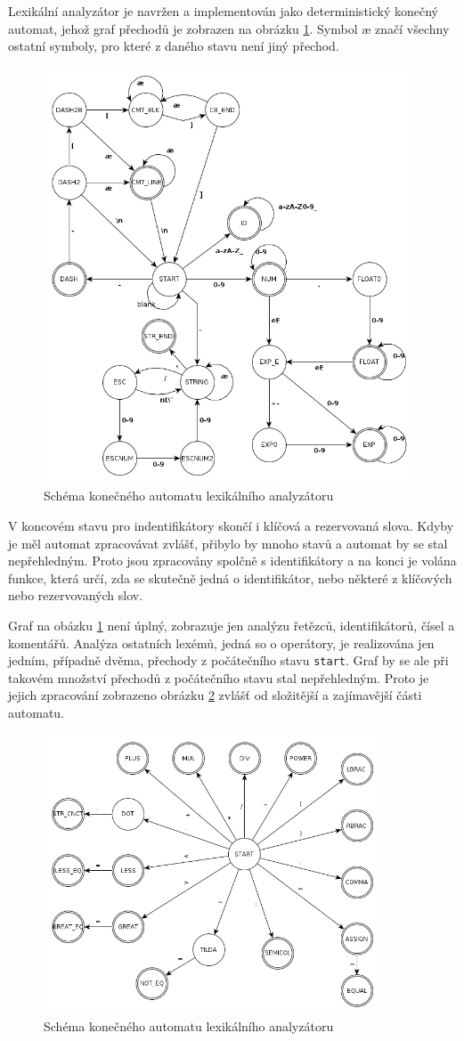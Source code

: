 Lexikální analyzátor je navržen a implementován jako deterministický ko\-neč\-ný automat, jehož graf přechodů je zobrazen na obrázku \ref{lex.lex}. Symbol \ae{} značí všechny ostatní symboly, pro které z daného stavu není jiný přechod.

\begin{figure}[h!]
\centering
\includegraphics[width=11cm]{lexical.png}
\caption{Schéma konečného automatu lexikálního analyzátoru}
\label{lex.lex}
\end{figure}

V koncovém stavu pro indentifikátory skončí i klíčová a rezervovaná slova. Kdyby je měl automat zpracovávat zvlášť, přibylo by mnoho stavů a automat by se stal nepřehledným. Proto jsou zpracovány spolčně s identifikátory a na konci je volána funkce, která určí, zda se skutečně jedná o identifikátor, nebo některé z klíčových nebo rezervovaných slov.

Graf na obázku \ref{lex.lex} není úplný, zobrazuje jen analýzu řetězců, identifikátorů, čísel a komentářů. Analýza ostatních lexémů, jedná so o operátory, je realizována jen jedním, případně dvěma, přechody z počátečního stavu {\tt start}. Graf by se ale při takovém množství přechodů z počátečního stavu stal nepřehledným. Proto je jejich zpracování zobrazeno obrázku \ref{lex.ope} zvlášť od složitější a zajímavější části automatu.

\begin{figure}
\centering
\includegraphics[width=10cm]{operator.png}
\caption{Schéma konečného automatu lexikálního analyzátoru}
\label{lex.ope}
\end{figure}
